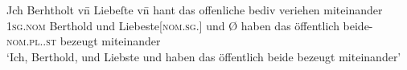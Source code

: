 \begin{exe}
\ex \label{ex:vvfinctrl}


		\gll Jch Berhtholt vn̄ Liebeſte \textelp{} vn̄ {} hant das offenliche
				bediv veriehen miteinander \\
			\textsc{1sg\subM.nom} Berthold und Liebeste[\textsc{nom.sg.\FemF}]
				{} und Ø\subMF{} haben das öffentlich
				beide-\textsc{nom.pl.\NeutMF.st} bezeugt miteinander \\
		\trans `Ich, Berthold, und Liebste \textelp{} und 
			haben das öffentlich beide bezeugt miteinander'
			\parencites(Nr.~N~150, Kl.~Niedermünster, Dépt.~Bas-Rhin, 1277)[108,31--32]{cao5}

\end{exe}


